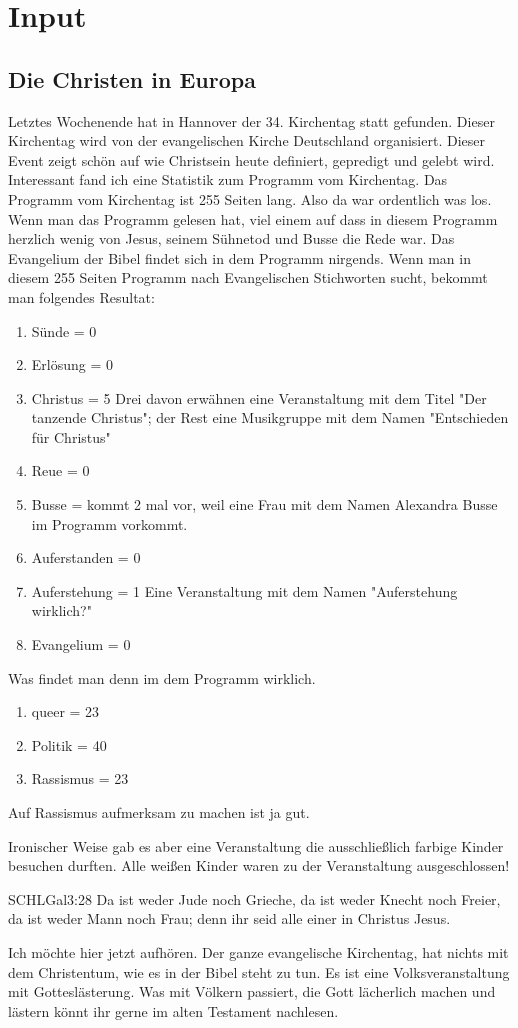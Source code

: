 \documentclass{../../inc/mybib}
\begin{document}
\section{ Input }
\begin{spacing}{1.5}
\subsection{Die Christen in Europa}
Letztes Wochenende hat in Hannover der 34. Kirchentag statt gefunden. Dieser Kirchentag wird von der evangelischen Kirche Deutschland organisiert. Dieser Event zeigt schön auf wie Christsein heute definiert, gepredigt und gelebt wird. Interessant fand ich eine Statistik zum Programm vom Kirchentag. Das Programm vom Kirchentag ist 255 Seiten lang. Also da war ordentlich was los.\\
Wenn man das Programm gelesen hat, viel einem auf dass in diesem Programm herzlich wenig von Jesus, seinem Sühnetod und Busse die Rede war. Das Evangelium der Bibel findet sich in dem Programm nirgends. Wenn man in diesem 255 Seiten Programm nach Evangelischen Stichworten sucht, bekommt man folgendes Resultat:
\begin{enumerate}
    \item Sünde = 0
    \item Erlösung = 0
    \item Christus = 5 Drei davon erwähnen eine Veranstaltung mit dem Titel "Der tanzende Christus"; der Rest eine Musikgruppe mit dem Namen "Entschieden für Christus"
    \item Reue = 0
    \item Busse = kommt 2 mal vor, weil eine Frau mit dem Namen Alexandra Busse im Programm vorkommt.
    \item Auferstanden = 0
    \item Auferstehung = 1 Eine Veranstaltung mit dem Namen "Auferstehung wirklich?"
    \item Evangelium = 0
\end{enumerate}
Was findet man denn im dem Programm wirklich.
\begin{enumerate}
    \item queer = 23
    \item Politik = 40
    \item Rassismus = 23
\end{enumerate}
Auf Rassismus aufmerksam zu machen ist ja gut.

Ironischer Weise gab es aber eine Veranstaltung die ausschließlich farbige Kinder besuchen durften. Alle weißen Kinder waren zu der Veranstaltung ausgeschlossen!
\begin{bibelbox}{SCHL}{Gal}{3:28}
Da ist weder Jude noch Grieche, da ist weder Knecht noch Freier, da ist weder Mann noch Frau; denn ihr seid alle einer in Christus Jesus.
\end{bibelbox}
Ich möchte hier jetzt aufhören. Der ganze evangelische Kirchentag, hat nichts mit dem Christentum, wie es in der Bibel steht zu tun. Es ist eine Volksveranstaltung mit Gotteslästerung. Was mit Völkern passiert, die Gott lächerlich machen und lästern könnt ihr gerne im alten Testament nachlesen.


\end{spacing}
\end{document}

